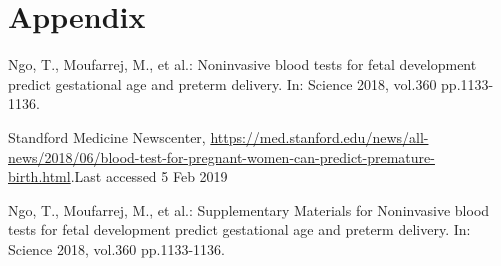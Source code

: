 \documentclass[]{llncs}
\begin{document}
\section{Appendix}

%
%
%
% 
% 
%
\begin{thebibliography}{8}
Ngo, T., Moufarrej, M., et al.: Noninvasive blood tests for fetal development predict gestational age and preterm delivery. In: Science 2018, vol.360 pp.1133-1136.  

Standford Medicine Newscenter, \url{https://med.stanford.edu/news/all-news/2018/06/blood-test-for-pregnant-women-can-predict-premature-birth.html}.Last accessed 5 Feb 2019

Ngo, T., Moufarrej, M., et al.: Supplementary Materials for Noninvasive blood tests for fetal development predict gestational age and preterm delivery. In: Science 2018, vol.360 pp.1133-1136.  



\end{thebibliography}
\end{document}
